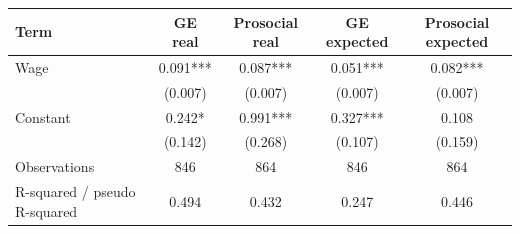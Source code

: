 \begin{tabular}{lcccc}
\hline
Term & GE real & Prosocial real & GE expected & Prosocial expected \\
\hline
Wage & 0.091*** & 0.087*** & 0.051*** & 0.082*** \\
 & (0.007) & (0.007) & (0.007) & (0.007) \\
Constant & 0.242* & 0.991*** & 0.327*** & 0.108 \\
 & (0.142) & (0.268) & (0.107) & (0.159) \\
Observations & 846 & 864 & 846 & 864 \\
R-squared / pseudo R-squared & 0.494 & 0.432 & 0.247 & 0.446 \\
\hline
\end{tabular}
